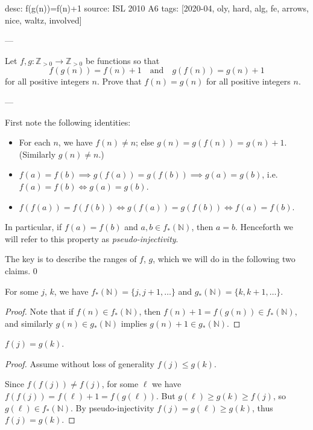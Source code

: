 desc: f(g(n))=f(n)+1
source: ISL 2010 A6
tags: [2020-04, oly, hard, alg, fe, arrows, nice, waltz, involved]

---

Let $f,g:\mathbb Z_{>0}\to\mathbb Z_{>0}$ be functions so that \[f(g(n))=f(n)+1\quad\text{and}\quad g(f(n))=g(n)+1\]
for all positive integers $n$. Prove that $f(n)=g(n)$ for all positive integers $n$.

---

First note the following identities:
\begin{itemize}[itemsep=0em]
    \item For each $n$, we have $f(n)\ne n$; else $g(n)=g(f(n))=g(n)+1$. (Similarly $g(n)\ne n$.)
    \item $f(a)=f(b)\implies g(f(a))=g(f(b))\implies g(a)=g(b)$, i.e.\ $f(a)=f(b)\iff g(a)=g(b)$.
    \item $f(f(a))=f(f(b))\iff g(f(a))=g(f(b))\iff f(a)=f(b)$.
\end{itemize}
In particular, if $f(a)=f(b)$ and $a,b\in f_*(\mathbb N)$, then $a=b$. Henceforth we will refer to this property as \emph{pseudo-injectivity}.

The key is to describe the ranges of $f$, $g$, which we will do in the following two claims.
\setcounter{claim}0
\begin{claim}
    For some $j$, $k$, we have $f_*(\mathbb N)=\{j,j+1,\ldots\}$ and $g_*(\mathbb N)=\{k,k+1,\ldots\}$.
\end{claim}
\begin{proof}
Note that if $f(n)\in f_*(\mathbb N)$, then $f(n)+1=f(g(n))\in f_*(\mathbb N)$, and similarly $g(n)\in g_*(\mathbb N)$ implies $g(n)+1\in g_*(\mathbb N)$.
\end{proof}
\begin{claim}
    $f(j)=g(k)$.
\end{claim}
\begin{proof}
    Assume without loss of generality $f(j)\le g(k)$.

    Since $f(f(j))\ne f(j)$, for some $\ell$ we have $f(f(j))=f(\ell)+1=f(g(\ell))$. But $g(\ell)\ge g(k)\ge f(j)$, so $g(\ell)\in f_*(\mathbb N)$. By pseudo-injectivity $f(j)=g(\ell)\ge g(k)$, thus $f(j)=g(k)$.
\end{proof}

